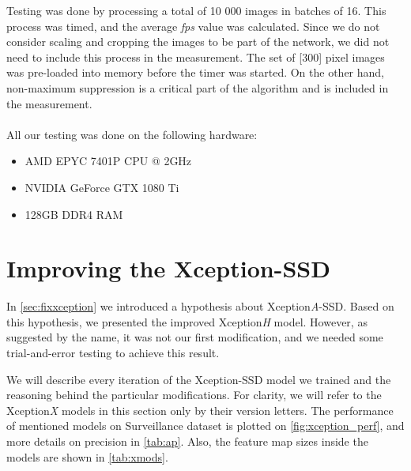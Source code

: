 Testing was done by processing a total of 10 000 images in batches of 16. This process was timed, and the average \textit{fps} value was calculated.  Since we do not consider scaling and cropping the images to be part of the network, we did not need to include this process in the measurement. The set of [300] pixel images was pre-loaded into memory before the timer was started. On the other hand, non-maximum suppression is a critical part of the algorithm and is included in the measurement. 

\paragraph{}
\noindent All our testing was done on the following hardware:
\begin{itemize}
    \item AMD EPYC 7401P CPU @ 2GHz 
    \item NVIDIA GeForce GTX 1080 Ti
    \item 128GB DDR4 RAM
\end{itemize}


\section{Improving the Xception-SSD}
In \cref{sec:fixxception} we introduced a hypothesis about Xception\textit{A}-SSD. Based on this hypothesis, we presented the improved Xception\textit{H} model. However, as suggested by the name, it was not our first modification, and we needed some trial-and-error testing to achieve this result.

We will describe every iteration of the Xception-SSD model we trained and the reasoning behind the particular modifications. For clarity, we will refer to the Xception\textit{X} models in this section only by their version letters. The performance of mentioned models on Surveillance dataset is plotted on \cref{fig:xception_perf}, and more details on precision in \cref{tab:ap}. Also, the feature map sizes inside the models are shown in \cref{tab:xmods}.


